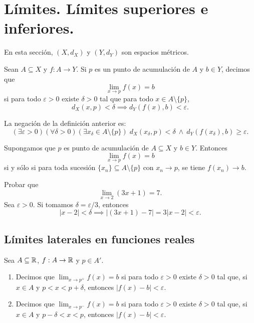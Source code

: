\section{Límites. Límites superiores e inferiores.}

En esta sección, $(X,d_X)$ y $(Y,d_Y)$ son espacios métricos.

\begin{definicion}
Sean $A\subseteq X$ y $f:A\to Y$.
Si $p$ es un punto de acumulación de $A$ y $b\in Y$, decimos que
\[
\lim_{x\to p}f(x)=b
\]
si para todo $\varepsilon>0$ existe $\delta>0$ tal que para todo $x\in A\setminus\{p\}$,
\[
d_X(x,p)<\delta \implies d_Y(f(x),b)<\varepsilon.
\]
\end{definicion}

\begin{remark}
La negación de la definición anterior es:
\[
(\exists\varepsilon>0)(\forall\delta>0)(\exists x_\delta\in A\setminus\{p\})\;
d_X(x_\delta,p)<\delta \ \land\ d_Y(f(x_\delta),b)\ge\varepsilon.
\]
\end{remark}

\begin{teorema}
Supongamos que $p$ es punto de acumulación de $A\subseteq X$ y $b\in Y$.
Entonces
\[
\lim_{x\to p}f(x)=b
\]
si y sólo si para toda sucesión $\{x_n\}\subseteq A\setminus\{p\}$ con $x_n\to p$, se tiene $f(x_n)\to b$.
\end{teorema}

\begin{example}
Probar que
\[
\lim_{x\to 2}(3x+1)=7.
\]
Sea $\varepsilon>0$. Si tomamos $\delta=\varepsilon/3$, entonces
\[
|x-2|<\delta \implies |(3x+1)-7|=3|x-2|<\varepsilon.
\]
\end{example}

\subsection*{Límites laterales en funciones reales}

Sea $A\subseteq\mathbb{R}$, $f:A\to\mathbb{R}$ y $p\in A'$.

\begin{definicion}
\begin{enumerate}
    \item Decimos que $\lim_{x\to p^+}f(x)=b$ si para todo $\varepsilon>0$ existe $\delta>0$ tal que, si $x\in A$ y $p<x<p+\delta$, entonces $|f(x)-b|<\varepsilon$.
    \item Decimos que $\lim_{x\to p^-}f(x)=b$ si para todo $\varepsilon>0$ existe $\delta>0$ tal que, si $x\in A$ y $p-\delta<x<p$, entonces $|f(x)-b|<\varepsilon$.
\end{enumerate}
\end{definicion}

